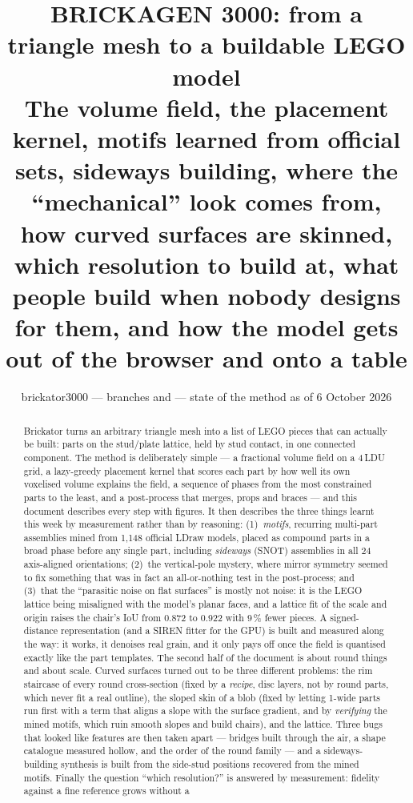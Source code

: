 \documentclass[10pt,a4paper]{article}
\title{\vspace{-1.2cm}\textbf{BRICKAGEN 3000: from a triangle mesh to a buildable LEGO model}\\[0.3em]
\large The volume field, the placement kernel, motifs learned from official sets, sideways building, where the ``mechanical'' look
comes from, how curved surfaces are skinned, which resolution to build at, what people build when nobody designs for them, and how
the model gets out of the browser and onto a table}
\author{\small brickator3000 --- branches \code{next} and \code{siren} --- state of the method as of 6 October 2026}
\date{}
\newcommand{\ldu}{\,LDU}
\begin{document}
\maketitle
\vspace{-0.8cm}
\begin{abstract}
\noindent Brickator turns an arbitrary triangle mesh into a list of LEGO pieces that can actually be built: parts on the stud/plate
lattice, held by stud contact, in one connected component. The method is deliberately simple --- a fractional volume field on a
4\ldu{} grid, a lazy-greedy placement kernel that scores each part by how well its own voxelised volume explains the field, a
sequence of phases from the most constrained parts to the least, and a post-process that merges, props and braces --- and this
document describes every step with figures. It then describes the three things learnt this week by measurement rather than by
reasoning: (1)~\emph{motifs}, recurring multi-part assemblies mined from 1,148 official LDraw models, placed as compound parts in a
broad phase before any single part, including \emph{sideways} (SNOT) assemblies in all 24 axis-aligned orientations;
(2)~the vertical-pole mystery, where mirror symmetry seemed to fix something that was in fact an all-or-nothing test in the
post-process; and (3)~that the ``parasitic noise on flat surfaces'' is mostly not noise: it is the LEGO lattice being misaligned
with the model's planar faces, and a lattice fit of the scale and origin raises the chair's IoU from 0.872 to 0.922 with 9\,\%
fewer pieces. A signed-distance representation (and a SIREN fitter for the GPU) is built and measured along the way: it works,
it denoises real grain, and it only pays off once the field is quantised exactly like the part templates.
The second half of the document is about round things and about scale. Curved surfaces turned out to be three different
problems: the rim staircase of every round cross-section (fixed by a \emph{recipe}, disc layers, not by round parts, which never
fit a real outline), the sloped skin of a blob (fixed by letting 1-wide parts run first with a term that aligns a slope with the
surface gradient, and by \emph{verifying} the mined motifs, which ruin smooth slopes and build chairs), and the lattice. Three bugs
that looked like features are then taken apart --- bridges built through the air, a shape catalogue measured hollow, and the
order of the round family --- and a sideways-building synthesis is built from the side-stud positions recovered from the mined
motifs. Finally the question ``which resolution?'' is answered by measurement: fidelity against a fine reference grows without a

\end{abstract}
\end{document}
